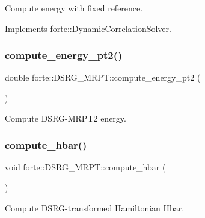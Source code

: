Compute energy with fixed reference. 



Implements \mbox{\hyperlink{classforte_1_1_dynamic_correlation_solver_aff4c7ebdca64563939d6e3ab8a262150}{forte\+::\+Dynamic\+Correlation\+Solver}}.

\mbox{\label{classforte_1_1_d_s_r_g___m_r_p_t_a1098b57f27bf9694a24359d4433dc755}} 
\subsubsection{\texorpdfstring{compute\+\_\+energy\+\_\+pt2()}{compute\_energy\_pt2()}}
{\footnotesize\ttfamily double forte\+::\+D\+S\+R\+G\+\_\+\+M\+R\+P\+T\+::compute\+\_\+energy\+\_\+pt2 (\begin{DoxyParamCaption}{ }\end{DoxyParamCaption})\hspace{0.3cm}{\ttfamily [protected]}}



Compute D\+S\+R\+G-\/\+M\+R\+P\+T2 energy. 

\mbox{\label{classforte_1_1_d_s_r_g___m_r_p_t_a2272dc6667027e7863e40f033f4bf741}} 
\subsubsection{\texorpdfstring{compute\+\_\+hbar()}{compute\_hbar()}}
{\footnotesize\ttfamily void forte\+::\+D\+S\+R\+G\+\_\+\+M\+R\+P\+T\+::compute\+\_\+hbar (\begin{DoxyParamCaption}{ }\end{DoxyParamCaption})\hspace{0.3cm}{\ttfamily [protected]}}



Compute D\+S\+R\+G-\/transformed Hamiltonian Hbar. 

